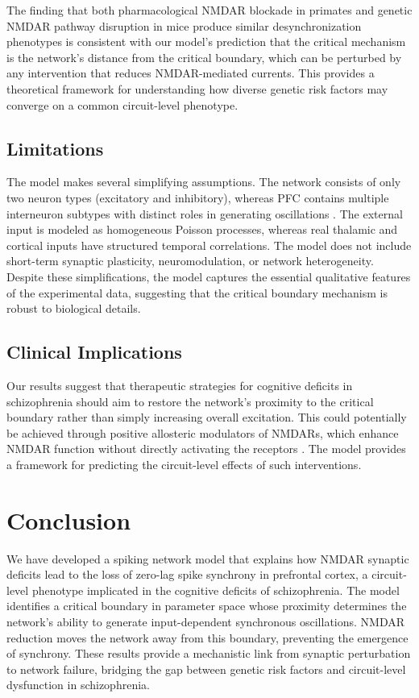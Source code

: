 \documentclass[11pt]{article}
\begin{document}
The finding that both pharmacological NMDAR blockade in primates and genetic NMDAR pathway disruption in mice produce similar desynchronization phenotypes \citep{zick2018blocking, kummerfeld2020dendritic} is consistent with our model's prediction that the critical mechanism is the network's distance from the critical boundary, which can be perturbed by any intervention that reduces NMDAR-mediated currents. This provides a theoretical framework for understanding how diverse genetic risk factors may converge on a common circuit-level phenotype.

\subsection{Limitations}

The model makes several simplifying assumptions. The network consists of only two neuron types (excitatory and inhibitory), whereas PFC contains multiple interneuron subtypes with distinct roles in generating oscillations \citep{hu2014interneurons}. The external input is modeled as homogeneous Poisson processes, whereas real thalamic and cortical inputs have structured temporal correlations. The model does not include short-term synaptic plasticity, neuromodulation, or network heterogeneity. Despite these simplifications, the model captures the essential qualitative features of the experimental data, suggesting that the critical boundary mechanism is robust to biological details.

\subsection{Clinical Implications}

Our results suggest that therapeutic strategies for cognitive deficits in schizophrenia should aim to restore the network's proximity to the critical boundary rather than simply increasing overall excitation. This could potentially be achieved through positive allosteric modulators of NMDARs, which enhance NMDAR function without directly activating the receptors \citep{bhatt2017targeting}. The model provides a framework for predicting the circuit-level effects of such interventions.

\section{Conclusion}

We have developed a spiking network model that explains how NMDAR synaptic deficits lead to the loss of zero-lag spike synchrony in prefrontal cortex, a circuit-level phenotype implicated in the cognitive deficits of schizophrenia. The model identifies a critical boundary in parameter space whose proximity determines the network's ability to generate input-dependent synchronous oscillations. NMDAR reduction moves the network away from this boundary, preventing the emergence of synchrony. These results provide a mechanistic link from synaptic perturbation to network failure, bridging the gap between genetic risk factors and circuit-level dysfunction in schizophrenia.



\end{document}
